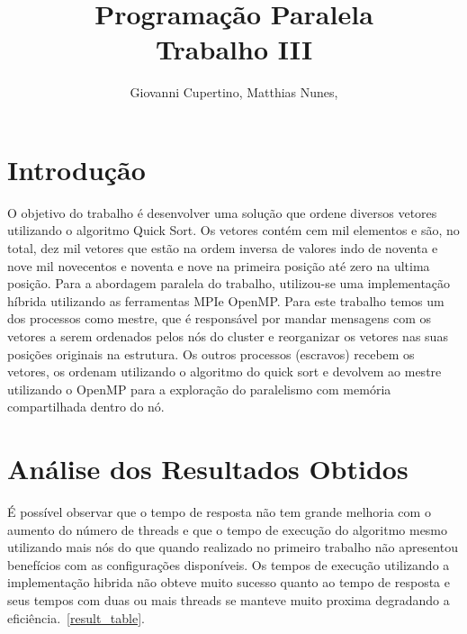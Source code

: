 \documentclass[11pt]{IEEEtran}
\title{Programação Paralela\\ Trabalho III}
\author{Giovanni Cupertino, Matthias Nunes, \IEEEmembership{Usuário pp12820}}
\begin{document}
\maketitle

\section{Introdução}

	O objetivo do trabalho é desenvolver uma solução que ordene diversos vetores
	utilizando o algoritmo Quick Sort.  Os vetores contém cem mil elementos e
	são, no total, dez mil vetores que estão na ordem inversa de valores indo de
	noventa e nove mil novecentos e noventa e nove na primeira posição até zero
	na ultima posição.  Para a abordagem paralela do trabalho, utilizou-se uma
	implementação híbrida utilizando as ferramentas MPI\@ e OpenMP. Para este 
	trabalho temos um dos processos como mestre, que é responsável por mandar 
	mensagens com os vetores a serem ordenados pelos nós do cluster e reorganizar
	os vetores nas suas posições originais na estrutura. Os outros processos 
	(escravos) recebem os vetores, os ordenam utilizando o algoritmo do quick sort
	e devolvem ao mestre utilizando o OpenMP para a exploração do paralelismo com 
	memória compartilhada dentro do nó.

\section{Análise dos Resultados Obtidos}

	É possível observar que o tempo de resposta não tem grande melhoria com o
	aumento do número de threads e que o tempo de execução do algoritmo mesmo 
	utilizando mais nós do que quando realizado no primeiro trabalho não apresentou
	benefícios com as configurações disponíveis. Os tempos de execução utilizando
	a implementação hibrida não obteve muito sucesso quanto ao tempo de resposta
	e seus tempos com duas ou mais threads se manteve muito proxima degradando a
	eficiência.~\ref{result_table}.
\end{document}
